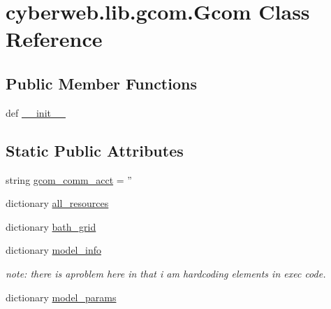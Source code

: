 \hypertarget{classcyberweb_1_1lib_1_1gcom_1_1_gcom}{\section{cyberweb.\-lib.\-gcom.\-Gcom \-Class \-Reference}
\label{classcyberweb_1_1lib_1_1gcom_1_1_gcom}
}
\subsection*{\-Public \-Member \-Functions}
\begin{DoxyCompactItemize}
\item 
def \hyperlink{classcyberweb_1_1lib_1_1gcom_1_1_gcom_a4a3a8113c91c743563b228d24a0eace4}{\-\_\-\-\_\-init\-\_\-\-\_\-}
\end{DoxyCompactItemize}
\subsection*{\-Static \-Public \-Attributes}
\begin{DoxyCompactItemize}
\item 
string \hyperlink{classcyberweb_1_1lib_1_1gcom_1_1_gcom_a6251cadcc78301410cf3856f8187cd89}{gcom\-\_\-comm\-\_\-acct} = ''
\item 
dictionary \hyperlink{classcyberweb_1_1lib_1_1gcom_1_1_gcom_a723773d40b89c4248e251831aef183f8}{all\-\_\-resources}
\item 
dictionary \hyperlink{classcyberweb_1_1lib_1_1gcom_1_1_gcom_a7a9884174cf426954d4263512ad5259c}{bath\-\_\-grid}
\item 
dictionary \hyperlink{classcyberweb_1_1lib_1_1gcom_1_1_gcom_a330ebc7950eec1558d9b88203c72211b}{model\-\_\-info}
\begin{DoxyCompactList}\small\item\em note\-: there is aproblem here in that i am hardcoding elements in exec code. \end{DoxyCompactList}\item 
dictionary \hyperlink{classcyberweb_1_1lib_1_1gcom_1_1_gcom_a04fa69d734f69881e0a237082d1109ff}{model\-\_\-params}
\end{DoxyCompactItemize}


